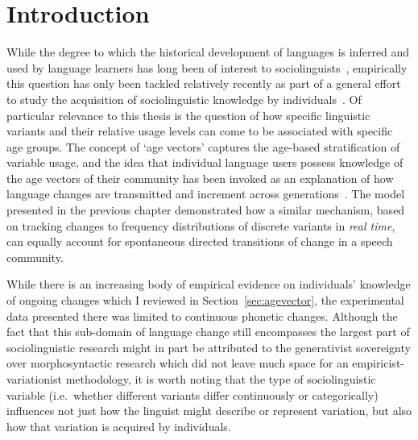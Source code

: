 \section{Introduction}

While the degree to which the historical development of languages is inferred and used by language learners has long been of interest to sociolinguists~\citep{Labov1989}, empirically this question has only been tackled relatively recently as part of a general effort to study the acquisition of sociolinguistic knowledge by individuals~\citep{Labov2014,Foulkes2015}.
Of particular relevance to this thesis is the question of how specific linguistic variants and their relative usage levels can come to be associated with specific age groups.
The concept of `age vectors' captures the age-based stratification of variable usage, and the idea that individual language users possess knowledge of the age vectors of their community has been invoked as an explanation of how language changes are transmitted and increment across generations~\citep{Labov2001}.
The model presented in the previous chapter demonstrated how a similar mechanism, based on tracking changes to frequency distributions of discrete variants in \emph{real time}, can equally account for spontaneous directed transitions of change in a speech community.

While there is an increasing body of empirical evidence on individuals' knowledge of ongoing changes which I reviewed in Section~\ref{sec:agevector}, the experimental data presented there was limited to continuous phonetic changes. Although the fact that this sub-domain of language change still encompasses the largest part of sociolinguistic research might in part be attributed to the generativist sovereignty over morphosyntactic research which did not leave much space for an empiricist-variationist methodology, it is worth noting that the type of sociolinguistic variable (i.e.~whether different variants differ continuously or categorically) influences not just how the linguist might describe or represent variation, but also how that variation is acquired by individuals. %

